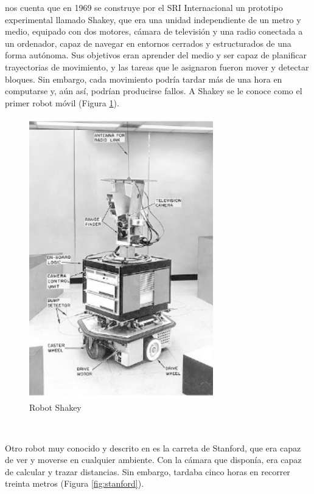 \cite{nilsson1984shakey} nos cuenta que en 1969 se construye por el \ac{SRI} Internacional un prototipo experimental llamado Shakey, que era una unidad independiente de un metro y medio, equipado con dos motores, cámara de televisión y una radio conectada a un ordenador, capaz de navegar en entornos cerrados y estructurados de una forma autónoma. Sus objetivos eran aprender del medio y ser capaz de planificar trayectorias de movimiento, y las tareas que le asignaron fueron mover y detectar bloques. Sin embargo, cada movimiento podría tardar más de una hora en computarse y, aún así, podrían producirse fallos. A Shakey se le conoce como el primer robot móvil (Figura \ref{fig:shakey}). \\

\begin{figure} [h!]
	\begin{center}
		\includegraphics[width=8cm]{figs/shakey.png}
	\end{center}
	\caption{Robot Shakey} %
	\label{fig:shakey}
\end{figure}\


Otro robot muy conocido  y descrito en \cite{earnest2012stanfordcart} es la carreta de Stanford, que era capaz de ver y moverse en cualquier ambiente. Con la cámara que disponía, era capaz de calcular y trazar distancias. Sin embargo, tardaba cinco horas en recorrer treinta metros (Figura \ref{fig:stanford}). 


